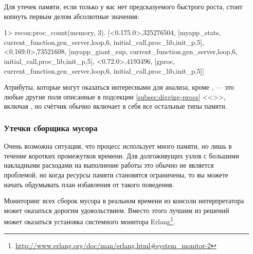 \documentclass[11pt, oneside]{book}   	%
\newcommand\NamedRef[1]{\ref{#1} <<\nameref{#1}>>}
\begin{document}
Для утечек памяти, если только у вас нет предсказуемого быстрого роста, стоит копнуть первым делом абсолютные значения:

\begin{VerbatimEshell}
1> recon:proc_count(memory, 3).
[{<0.175.0>,325276504,
  [myapp_stats,
   {current_function,{gen_server,loop,6}},
   {initial_call,{proc_lib,init_p,5}}]},
 {<0.169.0>,73521608,
  [myapp_giant_sup,
   {current_function,{gen_server,loop,6}},
   {initial_call,{proc_lib,init_p,5}}]},
 {<0.72.0>,4193496,
  [gproc,
   {current_function,{gen_server,loop,6}},
   {initial_call,{proc_lib,init_p,5}}]}]
\end{VerbatimEshell}

Атрибуты, которые могут оказаться интересными для анализа, кроме , --- это любые другие поля описанные в подсекции \NamedRef{subsec:digging-procs}, включая , но счётчик  обычно включает в себя все остальные типы памяти.


\subsubsection{Утечки сборщика мусора}
\label{subsubsec:leak-gc}

Очень возможна ситуация, что процесс использует много памяти, но лишь в течение коротких промежутков времени. Для долгоживущих узлов с большими накладными расходами на выполнение работы это обычно не является проблемой, но когда ресурсы памяти становятся ограничены, то вы можете начать обдумывать план избавления от такого поведения.

Мониторинг всех сборок мусора в реальном времени из консоли интерпретатора может оказаться дорогим удовольствием. Вместо этого лучшим из решений может оказаться установка системного монитора Erlang\footnote{\href{http://www.erlang.org/doc/man/erlang.html\#system\_monitor-2}{http://www.erlang.org/doc/man/erlang.html\#system\_monitor-2}}.
\end{document}
